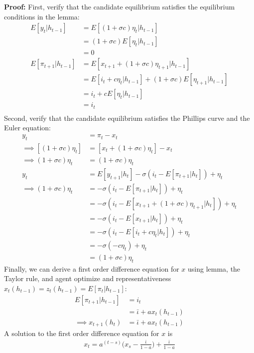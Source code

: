 \documentclass{article}
\begin{document}
\begin{enumerate}
\textbf{Proof:} First, verify that the candidate equilibrium satisfies the equilibrium conditions in the lemma:
\begin{align*}
E[y_t|h_{t-1}] 
&= E[(1+\sigma c)\eta_t|h_{t-1}]\\
&= (1+\sigma c)E[\eta_t|h_{t-1}]\\
&= 0\\
E[\pi_{t+1}|h_{t-1}] 
&= E[ x_{t+1} + (1 + \sigma c)\eta_{t+1}|h_{t-1}]\\
&= E[ i_t + c\eta_t|h_{t-1}] + (1 + \sigma c) E[\eta_{t+1}|h_{t-1}]\\
&= i_t + cE[ \eta_t|h_{t-1}]\\
&= i_t \\
\end{align*}
Second, verify that the candidate equilibrium satisfies the Phillips curve and the Euler equation:
\begin{align*}
y_t &= \pi_t - x_t\\
\implies
[(1+\sigma c)\eta_t] &= [x_t + (1+\sigma c)\eta_t] - x_t\\
\implies
(1+\sigma c)\eta_t &= (1+\sigma c)\eta_t\\
y_t &= E[y_{t+1}|h_t] - \sigma ( i_t - E[\pi_{t+1}|h_t]) + \eta_t \\
\implies 
(1+\sigma c) \eta_t 
&= - \sigma ( i_t - E[\pi_{t+1}|h_t]) + \eta_t\\
&= - \sigma ( i_t - E[x_{t+1} + (1+\sigma c) \eta_{t+1}|h_t]) + \eta_t\\
&= - \sigma ( i_t - E[x_{t+1}|h_t]) + \eta_t \\
&= - \sigma ( i_t - E[i_t + c \eta_t|h_t]) + \eta_t \\
&= - \sigma ( -c \eta_t) + \eta_t \\
&= (1+\sigma c) \eta_t 
\end{align*}
Finally, we can derive a first order difference equation for $x$ using lemma, the Taylor rule, and agent optimize and representativeness $x_t(h_{t-1}) = z_t(h_{t-1}) = E[\pi_t|h_{t-1}]$:
\begin{align*}
E[\pi_{t+1}|h_{t-1}] 
&= i_t\\
&= \bar \iota + a x_t(h_{t-1})\\
\implies 
x_{t+1}(h_t) 
&= \bar \iota + a x_t(h_{t-1})
\end{align*}
A solution to the first order difference equation for $x$ is
\begin{align*}
x_t = a^{(t-s)} \Bigg(x_s - \frac{\bar \iota}{1-a}\Bigg) + \frac{\bar \iota}{1-a}
\end{align*}

\end{enumerate}
\end{document}
